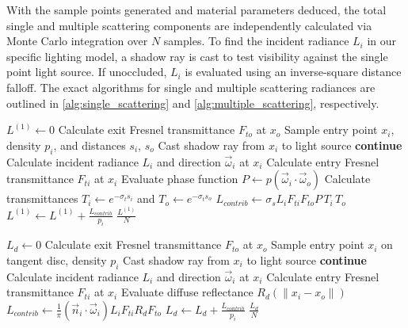 \documentclass[sigconf,nonacm]{acmart}
\begin{document}
With the sample points generated and material parameters deduced, the total single and multiple scattering components are independently calculated via Monte Carlo integration over $N$ samples. To find the incident radiance $L_i$ in our specific lighting model, a shadow ray is cast to test visibility against the single point light source. If unoccluded, $L_i$ is evaluated using an inverse-square distance falloff. The exact algorithms for single and multiple scattering radiances are outlined in \eqref{alg:single_scattering} and \eqref{alg:multiple_scattering}, respectively.

\begin{algorithm}[H]
    \caption{Radiance evaluation for single scattering.}
    \begin{algorithmic}
        \State $L^{(1)} \gets 0$
        \State Calculate exit Fresnel transmittance $F_{to}$ at $x_o$
        \State Sample entry point $x_i$, density $p_i$, and distances $s_i$, $s_o$
        \State Cast shadow ray from $x_i$ to light source
        \State \textbf{continue}
        \EndIf
        \State Calculate incident radiance $L_i$ and direction $\vec{\omega}_i$ at $x_i$
        \State Calculate entry Fresnel transmittance $F_{ti}$ at $x_i$
        \State Evaluate phase function $P \gets p(\vec{\omega}_i \cdot \vec{\omega}_o)$
        \State Calculate transmittances $T_i \gets e^{-\sigma_t s_i}$ and $T_o \gets e^{-\sigma_t s_o}$
        \State $L_{contrib} \gets \sigma_s L_i F_{ti} F_{to} P \, T_i \, T_o$
        \State $L^{(1)} \gets L^{(1)} + \frac{L_{contrib}}{p_i}$
        \EndFor
        \State \Return $\frac{L^{(1)}}{N}$
        \EndFunction
    \end{algorithmic}
    \label{alg:single_scattering}
\end{algorithm}

\begin{algorithm}[H]

    \caption{Radiance evaluation for multiple scattering.}
    \begin{algorithmic}
        \State $L_d \gets 0$
        \State Calculate exit Fresnel transmittance $F_{to}$ at $x_o$
        \State Sample entry point $x_i$ on tangent disc, density $p_i$
        \State Cast shadow ray from $x_i$ to light source
        \State \textbf{continue}
        \EndIf
        \State Calculate incident radiance $L_i$ and direction $\vec{\omega}_i$ at $x_i$
        \State Calculate entry Fresnel transmittance $F_{ti}$ at $x_i$
        \State Evaluate diffuse reflectance $R_d(\|x_i - x_o\|)$
        \State $L_{contrib} \gets \frac{1}{\pi} (\vec{n}_i \cdot \vec{\omega}_i) L_i F_{ti} R_d F_{to}$
        \State $L_d \gets L_d + \frac{L_{contrib}}{p_i}$
        \EndFor
        \State \Return $\frac{L_d}{N}$
        \EndFunction
    \end{algorithmic}
    \label{alg:multiple_scattering}
\end{algorithm}
\end{document}
